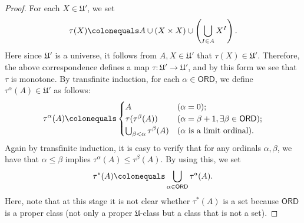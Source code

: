 \documentclass{surv-l}
\numberwithin{equation}{chapter}
\numberwithin{figure}{chapter}
\theoremstyle{plain}
\theoremstyle{definition}
\theoremstyle{remark}
\begin{document}
\begin{proof}
For each $X \in \mathfrak{U}'$, we set
\[
\tau(X)\colonequals   A \cup (X \times X) \cup \left(\bigcup_{I \in A} X^I\right).
\]
Here since $\mathfrak{U}'$ is a universe, it follows from $A, X \in \mathfrak{U}'$ that
$\tau(X) \in \mathfrak{U}'$.
Therefore, the above correspondence defines a map
$\tau\colon \mathfrak{U}' \to \mathfrak{U}'$,
and by this form we see that $\tau$ is monotone.
By transfinite induction, for each $\alpha \in \mathsf{ORD}$, we define
$\tau^\alpha(A) \in \mathfrak{U}'$ as follows:
\[
\tau^{\alpha}(A)\colonequals 
\begin{cases}
A & (\alpha = 0);\\
\tau(\tau^\beta(A)) & (\alpha = \beta + 1, \exists \beta \in \mathsf{ORD});\\
\bigcup_{\beta < \alpha} \tau^\beta(A) & (\alpha\text{ is a limit ordinal}).
\end{cases}
\]
Again by transfinite induction, it is easy to verify that
for any ordinals $\alpha, \beta$, we have that
$\alpha \le \beta$ implies $\tau^\alpha(A) \le \tau^\beta(A)$.
By using this, we set
\[
\tau^*(A)\colonequals  \bigcup_{\alpha \in \mathsf{ORD}}\tau^a(A).
\]
Here, note that at this stage it is not clear whether
$\tau^*(A)$ is a set because
$\mathsf{ORD}$ is a proper class (not only a proper $\mathfrak{U}$-class but a class that is not a set).


\end{proof}
\end{document}
